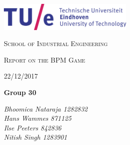 \documentclass[a4paper]{article} %
\begin{document}
\begin{titlepage}

\centering
\vspace{5cm}
\includegraphics[width=0.5\textwidth]{tuelogo}\\
{\scshape\Large School of Industrial Engineering \par}

\vspace{5cm}

	{\scshape\LARGE Report on the BPM Game\par}
	22/12/2017
	\vspace{1.5cm}
	\vfill
	{\huge\bfseries Group 30\par}
	\vspace{1.5cm}
	{\Large\itshape Bhoomica Nataraja	1282832\\
Hans Wammes	871125\\
Ilse Peeters	842836\\
Nitish Singh	1283901\\
     \par}
     \vfill
     
     
\end{titlepage}
\doublespacing
\tableofcontents
\singlespacing
\newpage
\end{document}
